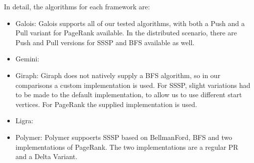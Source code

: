 In detail, the algorithms for each framework are:
\begin{itemize}
	\item Galois: Galois supports all of our tested algorithms, with both a Push and a Pull variant for PageRank available. In the distributed scenario, there are Push and Pull versions for SSSP and BFS available as well.
	\item Gemini: \todo{}
	\item Giraph: Giraph does not natively supply a BFS algorithm, so in our comparisons a custom implementation is used. For SSSP, slight variations had to be made to the default implementation, to allow us to use different start vertices. For PageRank the supplied implementation is used.
	\item Ligra: \todo{}
	\item Polymer: Polymer suppoerts SSSP based on BellmanFord, BFS and two implementations of PageRank. The two implementations are a regular PR and a Delta Variant.
\end{itemize}
